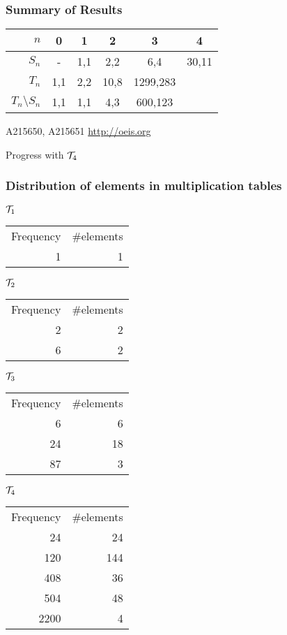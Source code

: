 \documentclass{beamer}
\newcommand{\cT}{{\cal T}}
\newcommand{\jump}{\vskip6pt}
\begin{document}
\begin{frame}\frametitle{Summary of Results}
\begin{center}

\begin{tabular}{|r|c|c|c|c|c|}
\hline
$n$ & 0 & 1 & 2 & 3 & 4 \\
\hline
$S_n$ & - & 1,1 & 2,2 & 6,4 & 30,11\\
\hline
$T_n$ &1,1 & 2,2 & 10,8 & 1299,283 & \\
\hline
$T_n\setminus S_n$ & 1,1 & 1,1 & 4,3 & 600,123& \\
\hline
\end{tabular}
\end{center}
A215650, A215651 \url{http://oeis.org}
\end{frame}

\begin{frame}{Progress with $\cT_4$}

\end{frame}

\begin{frame}
\frametitle{Distribution of elements in multiplication tables}
$\cT_{1}$
\begin{tabular}{r|r}
Frequency & \#elements\\
1 & 1\\
\end{tabular}
\jump
$\cT_{2}$
\begin{tabular}{r|r}
Frequency & \#elements\\
2 & 2\\
6 & 2\\
\end{tabular}
\jump
$\cT_{3}$
\begin{tabular}{r|r}
Frequency & \#elements\\
6 & 6\\
24 & 18\\
87 & 3\\
\end{tabular}
\jump
$\cT_{4}$
\begin{tabular}{r|r}
Frequency & \#elements\\
24 & 24\\
120 & 144\\
408 & 36\\
504 & 48\\
2200 & 4\\
\end{tabular}


\end{frame}
\end{document}
